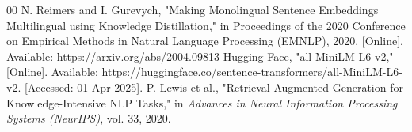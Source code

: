 \documentclass[conference]{IEEEtran}
\begin{document}
\begin{thebibliography}{00}
 N. Reimers and I. Gurevych, "Making Monolingual Sentence Embeddings Multilingual using Knowledge Distillation," in Proceedings of the 2020 Conference on Empirical Methods in Natural Language Processing (EMNLP), 2020. [Online]. Available: https://arxiv.org/abs/2004.09813
 Hugging Face, "all-MiniLM-L6-v2," [Online]. Available: https://huggingface.co/sentence-transformers/all-MiniLM-L6-v2. [Accessed: 01-Apr-2025].
 P. Lewis et al., "Retrieval-Augmented Generation for Knowledge-Intensive NLP Tasks," in \textit{Advances in Neural Information Processing Systems (NeurIPS)}, vol. 33, 2020.
\end{thebibliography}





\end{document}
